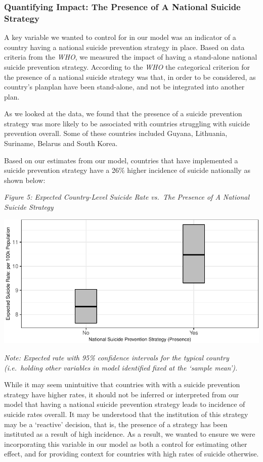 \documentclass[]{article}
\begin{document}
\subsubsection{Quantifying Impact: The Presence of A National Suicide
Strategy}\label{quantifying-impact-the-presence-of-a-national-suicide-strategy}

A key variable we wanted to control for in our model was an indicator of
a country having a national suicide prevention strategy in place. Based
on data criteria from the \emph{WHO}, we measured the impact of having a
stand-alone national suicide prevention strategy. According to the
\emph{WHO} the categorical criterion for the presence of a national
suicide strategy was that, in order to be considered, as country's
planplan have been stand-alone, and not be integrated into another plan.

As we looked at the data, we found that the presence of a suicide
prevention strategy was more likely to be associated with countries
struggling with suicide prevention overall. Some of these countries
included Guyana, Lithuania, Suriname, Belarus and South Korea.

Based on our estimates from our model, countries that have implemented a
suicide prevention strategy have a 26\% higher incidence of suicide
nationally as shown below:

\emph{Figure 5: Expected Country-Level Suicide Rate vs.~The Presence of
A National Suicide Strategy}

\begin{center}\includegraphics{Project_Report_files/figure-latex/sstrat_plot-1} \end{center}

\emph{Note: Expected rate with 95\% confidence intervals for the typical
country (i.e.~holding other variables in model identified fixed at the
`sample mean').}

While it may seem unintuitive that countries with with a suicide
prevention strategy have higher rates, it should not be inferred or
interpreted from our model that having a national suicide prevention
strategy leads to incidence of suicide rates overall. It may be
understood that the institution of this strategy may be a `reactive'
decision, that is, the presence of a strategy has been instituted as a
result of high incidence. As a result, we wanted to ensure we were
incorporating this variable in our model as both a control for
estimating other effect, and for providing context for countries with
high rates of suicide otherwise.
\end{document}

